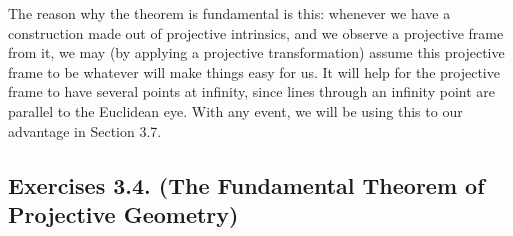 \documentclass[leqno]{book}
\begin{document}
The reason why the theorem is fundamental is this: whenever we have a construction made out of projective intrinsics, and we observe a projective frame from it, we may (by applying a projective transformation) assume this projective frame to be whatever will make things easy for us.  It will help for the projective frame to have several points at infinity, since lines through an infinity point are parallel to the Euclidean eye.  With any event, we will be using this to our advantage in Section 3.7.

\subsection*{Exercises 3.4. (The Fundamental Theorem of Projective Geometry)} %
\end{document}
